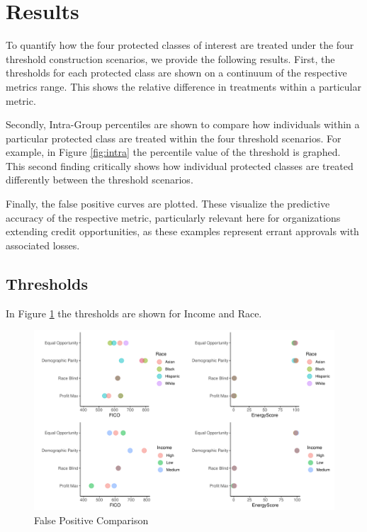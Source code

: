 \documentclass[11pt,]{article}
\begin{document}
\hypertarget{results}{%
\section{Results}\label{results}}

To quantify how the four protected classes of interest are treated under
the four threshold construction scenarios, we provide the following
results. First, the thresholds for each protected class are shown on a
continuum of the respective metrics range. This shows the relative
difference in treatments within a particular metric.

Secondly, Intra-Group percentiles are shown to compare how individuals
within a particular protected class are treated within the four
threshold scenarios. For example, in Figure \ref{fig:intra} the
percentile value of the threshold is graphed. This second finding
critically shows how individual protected classes are treated
differently between the threshold scenarios.

Finally, the false positive curves are plotted. These visualize the
predictive accuracy of the respective metric, particularly relevant here
for organizations extending credit opportunities, as these examples
represent errant approvals with associated losses.

\hypertarget{thresholds}{%
\subsection{Thresholds}\label{thresholds}}

In Figure \ref{fig:fpfig1} the thresholds are shown for Income and Race.

\begin{figure}
\centering
\includegraphics{figs/fpfig1.pdf}
\caption{\label{fig:fpfig1}False Positive Comparison}
\end{figure}
\end{document}
